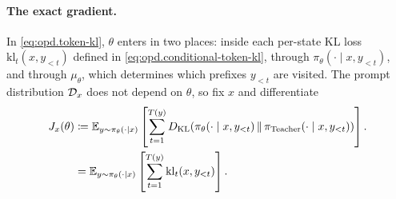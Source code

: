 \paragraph{The exact gradient.}
In \eqref{eq:opd.token-kl}, $\theta$ enters in two places: inside each per-state KL loss
$\mathrm{kl}_t(x,y_{<t})$ defined in \eqref{eq:opd.conditional-token-kl}, through $\pi_\theta(\cdot\mid x,y_{<t})$, and through $\mu_\theta$, which determines which prefixes $y_{<t}$ are visited. The prompt
distribution ${\cal D}_x$ does not depend on $\theta$, so fix $x$ and differentiate
\begin{align*}
    J_x(\theta)
    & \coloneqq
    \mathbb{E}_{y\sim\pi_\theta(\cdot\mid x)}
    \left[
        \sum_{t=1}^{T(y)}
    D_{\mathrm{KL}}\!\left(
        \pi_\theta(\cdot\mid x,y_{<t})
        \,\middle\|\,
        \pi_{\mathrm{Teacher}}(\cdot\mid x,y_{<t})\right)
    \right].
    \nonumber\\
    & =
    \mathbb{E}_{y\sim\pi_\theta(\cdot\mid x)}
    \left[
        \sum_{t=1}^{T(y)}\mathrm{kl}_t(x,y_{<t})
    \right].
\end{align*}
